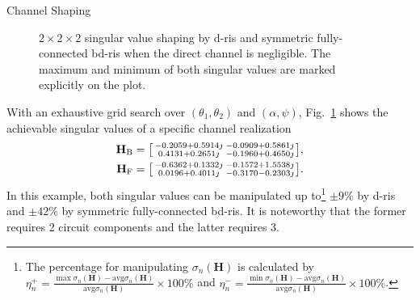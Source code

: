 \documentclass[journal]{IEEEtran}
\begin{document}
\begin{section}{Channel Shaping}
\begin{example}
\begin{figure}
			\caption{$2 \times 2 \times 2$ singular value shaping by \gls{d}-\gls{ris} and symmetric fully-connected \gls{bd}-\gls{ris} when the direct channel is negligible.
			The maximum and minimum of both singular values are marked explicitly on the plot.}
			\label{fg:shaping_potential}
		\end{figure}
		With an exhaustive grid search over $(\theta_1, \theta_2)$ and $(\alpha, \psi)$, Fig.~\ref{fg:shaping_potential} shows the achievable singular values of a specific channel realization
		\begin{equation*}
			\begin{split}
				\mathbf{H}_\mathrm{B} & =
				\begin{bsmallmatrix}
					-0.2059 + 0.5914 \jmath & -0.0909 + 0.5861 \jmath \\
					0.4131 + 0.2651 \jmath  & -0.1960 + 0.4650 \jmath
				\end{bsmallmatrix},
				\\
				\mathbf{H}_\mathrm{F} & =
				\begin{bsmallmatrix}
					-0.6362 + 0.1332 \jmath & -0.1572 + 1.5538 \jmath \\
					0.0196 + 0.4011 \jmath  & -0.3170 - 0.2303 \jmath
				\end{bsmallmatrix}.
			\end{split}
		\end{equation*}
		In this example, both singular values can be manipulated up to\footnote{The percentage for manipulating $\sigma_n(\mathbf{H})$ is calculated by $\eta_n^+ = \frac{\max \sigma_n(\mathbf{H}) - \mathrm{avg} \sigma_n(\mathbf{H})}{\mathrm{avg} \sigma_n(\mathbf{H})} \times 100\%$ and  $\eta_n^- = \frac{\min \sigma_n(\mathbf{H}) - \mathrm{avg} \sigma_n(\mathbf{H})}{\mathrm{avg} \sigma_n(\mathbf{H})} \times 100\%$.} $\pm 9\%$ by \gls{d}-\gls{ris} and $\pm 42\%$ by symmetric fully-connected \gls{bd}-\gls{ris}.
		It is noteworthy that the former requires 2 circuit components and the latter requires 3.
	\end{example}


\end{section}
\end{document}
